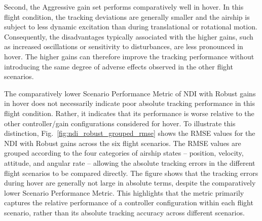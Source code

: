 Second, the Aggressive gain set performs comparatively well in hover. In this flight condition, the tracking deviations are generally smaller and the airship is subject to less dynamic excitation than during translational or rotational motion.
Consequently, the disadvantages typically associated with the higher gains, such as increased oscillations or sensitivity to disturbances, are less pronounced in hover. The higher gains can therefore improve the tracking performance without introducing the same degree of adverse effects observed in the other flight scenarios.

The comparatively lower Scenario Performance Metric of NDI with Robust gains in hover does not necessarily indicate poor absolute tracking performance in this flight condition. Rather, it indicates that its performance is worse relative to the other controller/gain configurations considered for hover. To illustrate this distinction, Fig.~\ref{fig:ndi_robust_grouped_rmse} shows the RMSE values for the NDI with Robust gains across the six flight scenarios. The RMSE values are grouped according to the four categories of airship states -- position, velocity, attitude, and angular rate -- allowing the absolute tracking errors in the different flight scenarios to be compared directly. The figure shows that the tracking errors during hover are generally not large in absolute terms, despite the comparatively lower Scenario Performance Metric. This highlights that the metric primarily captures the relative performance of a controller configuration within each flight scenario, rather than its absolute tracking accuracy across different scenarios.

